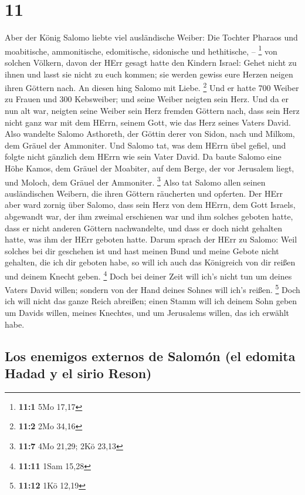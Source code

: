 \hypertarget{section-10}{%
\section{11}\label{section-10}}

 Aber der König Salomo liebte viel ausländische Weiber:
Die Tochter Pharaos und moabitische, ammonitische, edomitische,
sidonische und hethitische, -- \footnote{\textbf{11:1} 5Mo 17,17}
 von solchen Völkern, davon der HErr gesagt hatte den
Kindern Israel: Gehet nicht zu ihnen und lasst sie nicht zu euch kommen;
sie werden gewiss eure Herzen neigen ihren Göttern nach. An diesen hing
Salomo mit Liebe. \footnote{\textbf{11:2} 2Mo 34,16}  Und
er hatte 700 Weiber zu Frauen und 300 Kebsweiber; und seine Weiber
neigten sein Herz.  Und da er nun alt war, neigten seine
Weiber sein Herz fremden Göttern nach, dass sein Herz nicht ganz war mit
dem HErrn, seinem Gott, wie das Herz seines Vaters David. 
Also wandelte Salomo Asthoreth, der Göttin derer von Sidon, nach und
Milkom, dem Gräuel der Ammoniter.  Und Salomo tat, was dem
HErrn übel gefiel, und folgte nicht gänzlich dem HErrn wie sein Vater
David.  Da baute Salomo eine Höhe Kamos, dem Gräuel der
Moabiter, auf dem Berge, der vor Jerusalem liegt, und Moloch, dem Gräuel
der Ammoniter. \footnote{\textbf{11:7} 4Mo 21,29; 2Kö 23,13}
 Also tat Salomo allen seinen ausländischen Weibern, die
ihren Göttern räucherten und opferten.  Der HErr aber ward
zornig über Salomo, dass sein Herz von dem HErrn, dem Gott Israels,
abgewandt war, der ihm zweimal erschienen war  und ihm
solches geboten hatte, dass er nicht anderen Göttern nachwandelte, und
dass er doch nicht gehalten hatte, was ihm der HErr geboten hatte.
 Darum sprach der HErr zu Salomo: Weil solches bei dir
geschehen ist und hast meinen Bund und meine Gebote nicht gehalten, die
ich dir geboten habe, so will ich auch das Königreich von dir reißen und
deinem Knecht geben. \footnote{\textbf{11:11} 1Sam 15,28}
 Doch bei deiner Zeit will ich's nicht tun um deines
Vaters David willen; sondern von der Hand deines Sohnes will ich's
reißen. \footnote{\textbf{11:12} 1Kö 12,19}  Doch ich
will nicht das ganze Reich abreißen; einen Stamm will ich deinem Sohn
geben um Davids willen, meines Knechtes, und um Jerusalems willen, das
ich erwählt habe.

\hypertarget{los-enemigos-externos-de-salomuxf3n-el-edomita-hadad-y-el-sirio-reson}{%
\subsection{Los enemigos externos de Salomón (el edomita Hadad y el
sirio
Reson)}\label{los-enemigos-externos-de-salomuxf3n-el-edomita-hadad-y-el-sirio-reson}}

